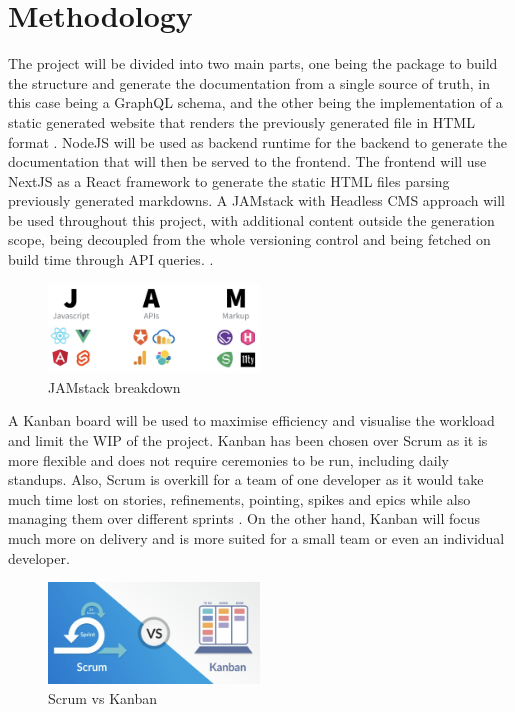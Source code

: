 \section*{Methodology}
\label{s:Methodology}
The project will be divided into two main parts, one being the package to build
the structure and generate the documentation from a single source of truth, in
this case being a GraphQL schema, and the other being the implementation of a
static generated website that renders the previously generated file in HTML
format \citep{gagliardiDjangoRESTMeets2021}. NodeJS will be used as backend
runtime for the backend to generate the documentation that will then be served
to the frontend. The frontend will use NextJS as a React framework to generate
the static HTML files parsing previously generated markdowns. A JAMstack with
Headless CMS approach will be used throughout this project, with additional
content outside the generation scope, being decoupled from the whole versioning
control and being fetched on build time through API queries.
\citep{zammettiWhatJAMstackAll2020}.
\begin{figure}[H]
  \centering
  \includegraphics[width=0.5\textwidth]{figures/jamstack}
  \caption{JAMstack breakdown \citep{freecodecampWhatJAMstackHow2020}}
  \label{f:jamstack}
\end{figure}
A Kanban board will be used to maximise efficiency and visualise the workload
and limit the WIP of the project. Kanban has been chosen over Scrum as it is
more flexible and does not require ceremonies to be run, including daily
standups. Also, Scrum is overkill for a team of one developer as it would take
much time lost on stories, refinements, pointing, spikes and epics while also
managing them over different sprints \citep{zayatFrameworkStudyAgile2020}. On
the other hand, Kanban will focus much more on delivery and is more suited for a
small team or even an individual developer.
\begin{figure}[H]
  \centering
  \includegraphics[width=0.5\textwidth]{figures/agile}
  \caption{Scrum vs Kanban \citep{theagilehelpScrumVsKanban2020}}
  \label{f:agile}
\end{figure}
